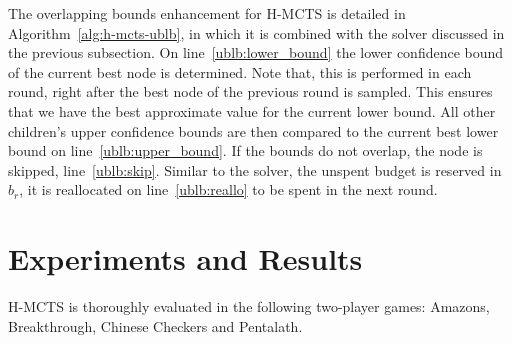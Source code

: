\documentclass{kecsmstr}
\begin{document}
The overlapping bounds enhancement for H-MCTS is detailed in Algorithm~\ref{alg:h-mcts-ublb}, in which it is combined with the solver discussed in the previous subsection. On line~\ref{ublb:lower_bound} the lower confidence bound of the current best node is determined. Note that, this is performed in each round, right after the best node of the previous round is sampled. This ensures that we have the best approximate value for the current lower bound. All other children's upper confidence bounds are then compared to the current best lower bound on line~\ref{ublb:upper_bound}. If the bounds do not overlap, the node is skipped, line~\ref{ublb:skip}. Similar to the solver, the unspent budget is reserved in $b_r$, it is reallocated on line~\ref{ublb:reallo} to be spent in the next round.

\chapter{Experiments and Results}
\label{chap:experiments}
\begin{chaptercontents}
H-MCTS is thoroughly evaluated in the following two-player games: Amazons, Breakthrough, Chinese Checkers and Pentalath.
\end{chaptercontents}
\end{document}
